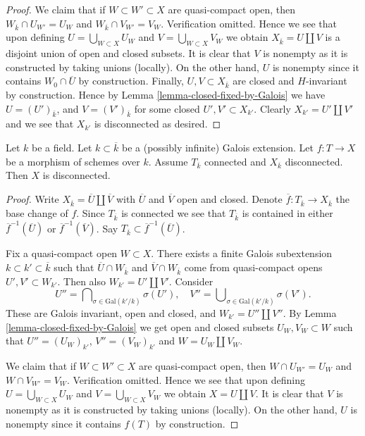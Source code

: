 \begin{proof}
\medskip\noindent
We claim that if $W \subset W' \subset X$ are quasi-compact
open, then $W_{\overline{k}} \cap U_{W'} = U_W$ and
$W_{\overline{k}} \cap V_{W'} = V_W$. Verification omitted.
Hence we see that upon defining $U = \bigcup_{W \subset X} U_W$
and $V = \bigcup_{W \subset X} V_W$ we obtain
$X_{\overline{k}} = U \amalg V$ is a disjoint union of open
and closed subsets.
It is clear that $V$ is nonempty as it is constructed by taking
unions (locally). On the other hand, $U$ is nonempty since it contains
$W_0 \cap \overline{U}$ by construction. Finally, $U, V \subset X_{\bar k}$
are closed and $H$-invariant by construction. Hence by
Lemma \ref{lemma-closed-fixed-by-Galois}
we have $U = (U')_{\bar k}$, and $V = (V')_{\bar k}$ for some
closed $U', V' \subset X_{k'}$. Clearly $X_{k'} = U' \amalg V'$
and we see that $X_{k'}$ is disconnected as desired.
\end{proof}

\begin{lemma}
\label{lemma-tricky}
Let $k$ be a field. Let $k \subset \overline{k}$ be a (possibly infinite)
Galois extension. Let $f : T \to X$ be a morphism of schemes over $k$.
Assume $T_{\overline{k}}$ connected and $X_{\overline{k}}$
disconnected. Then $X$ is disconnected.
\end{lemma}

\begin{proof}
Write $X_{\overline{k}} = \overline{U} \amalg \overline{V}$
with $\overline{U}$ and $\overline{V}$ open and closed.
Denote $\overline{f} : T_{\overline{k}} \to X_{\overline{k}}$ the base
change of $f$. Since $T_{\overline{k}}$ is connected we see that
$T_{\overline{k}}$ is contained in either $\overline{f}^{-1}(\overline{U})$
or $\overline{f}^{-1}(\overline{V})$.
Say $T_{\overline{k}} \subset \overline{f}^{-1}(\overline{U})$.

\medskip\noindent
Fix a quasi-compact open $W \subset X$. There exists a
finite Galois subextension $k \subset k' \subset \overline{k}$
such that $\overline{U} \cap W_{\overline{k}}$ and
$\overline{V} \cap W_{\overline{k}}$ come from quasi-compact
opens $U', V' \subset W_{k'}$. Then also $W_{k'} = U' \amalg V'$.
Consider
$$
U'' = \bigcap\nolimits_{\sigma \in \text{Gal}(k'/k)} \sigma(U'),
\quad
V'' = \bigcup\nolimits_{\sigma \in \text{Gal}(k'/k)} \sigma(V').
$$
These are Galois invariant, open and closed, and
$W_{k'} = U'' \amalg V''$.
By Lemma \ref{lemma-closed-fixed-by-Galois} we get open and closed subsets
$U_W, V_W \subset W$ such that
$U'' = (U_W)_{k'}$, $V'' = (V_W)_{k'}$ and
$W = U_W \amalg V_W$.

\medskip\noindent
We claim that if $W \subset W' \subset X$ are quasi-compact
open, then $W \cap U_{W'} = U_W$ and $W \cap V_{W'} = V_W$.
Verification omitted.
Hence we see that upon defining $U = \bigcup_{W \subset X} U_W$
and $V = \bigcup_{W \subset X} V_W$ we obtain $X = U \amalg V$.
It is clear that $V$ is nonempty as it is constructed by taking
unions (locally). On the other hand, $U$ is nonempty since it contains
$f(T)$ by construction.
\end{proof}

